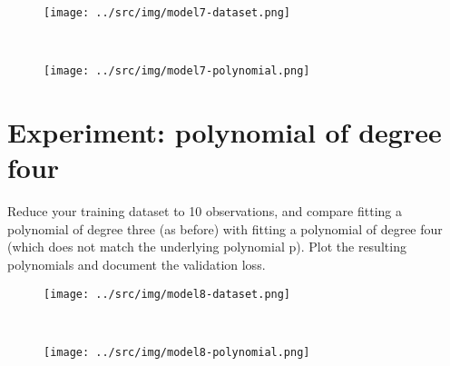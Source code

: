 \documentclass[a4paper,12pt]{article} %
\begin{document}
	\begin{figure}[H]
		\begin{minipage}[c]{.5\textwidth}
			\centering
			\texttt{[image: ../src/img/model7-dataset.png]}
			\label{fig:model7-dataset}
		\end{minipage}
		~
		\begin{minipage}[c]{.5\textwidth}
			\centering
			\texttt{[image: ../src/img/model7-polynomial.png]}
			\label{fig:model7-polynomial}
		\end{minipage}
	\end{figure}
	
	
	\section{Experiment: polynomial of degree four}
	Reduce your training dataset to 10 observations, and compare fitting a polynomial of degree three (as before) with fitting a polynomial of degree four (which does not match the underlying polynomial p). Plot the resulting polynomials and document the validation loss.
	
	\begin{figure}[H]
		\begin{minipage}[c]{.5\textwidth}
			\centering
			\texttt{[image: ../src/img/model8-dataset.png]}
			\label{fig:model8-dataset}
		\end{minipage}
		~
		\begin{minipage}[c]{.5\textwidth}
			\centering
			\texttt{[image: ../src/img/model8-polynomial.png]}
			\label{fig:model8-polynomial}
		\end{minipage}
	\end{figure}
	
	
\end{document}

